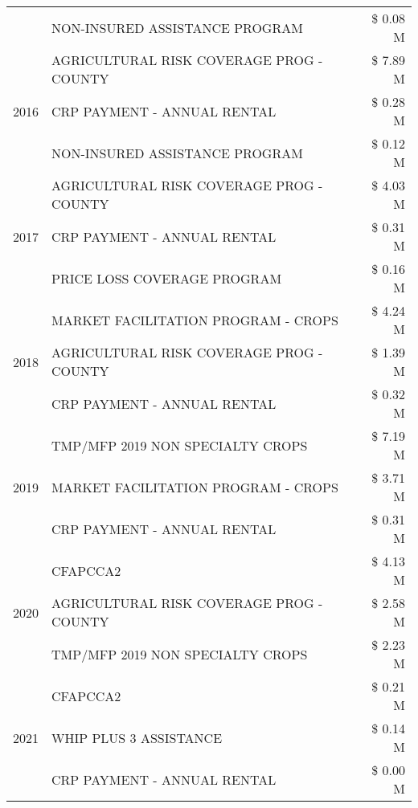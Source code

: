 \begin{tabular}{llr}
 & NON-INSURED ASSISTANCE PROGRAM & \$ 0.08 M \\
\cline{1-3}
\multirow[t]{3}{*}{2016} & AGRICULTURAL RISK COVERAGE PROG - COUNTY      & \$ 7.89 M \\
 & CRP PAYMENT - ANNUAL RENTAL                   & \$ 0.28 M \\
 & NON-INSURED ASSISTANCE PROGRAM                & \$ 0.12 M \\
\cline{1-3}
\multirow[t]{3}{*}{2017} & AGRICULTURAL RISK COVERAGE PROG - COUNTY & \$ 4.03 M \\
 & CRP PAYMENT - ANNUAL RENTAL & \$ 0.31 M \\
 & PRICE LOSS COVERAGE PROGRAM & \$ 0.16 M \\
\cline{1-3}
\multirow[t]{3}{*}{2018} & MARKET FACILITATION PROGRAM - CROPS & \$ 4.24 M \\
 & AGRICULTURAL RISK COVERAGE PROG - COUNTY & \$ 1.39 M \\
 & CRP PAYMENT - ANNUAL RENTAL & \$ 0.32 M \\
\cline{1-3}
\multirow[t]{3}{*}{2019} & TMP/MFP 2019 NON SPECIALTY CROPS & \$ 7.19 M \\
 & MARKET FACILITATION PROGRAM - CROPS & \$ 3.71 M \\
 & CRP PAYMENT - ANNUAL RENTAL & \$ 0.31 M \\
\cline{1-3}
\multirow[t]{3}{*}{2020} & CFAPCCA2 & \$ 4.13 M \\
 & AGRICULTURAL RISK COVERAGE PROG - COUNTY & \$ 2.58 M \\
 & TMP/MFP 2019 NON SPECIALTY CROPS & \$ 2.23 M \\
\cline{1-3}
\multirow[t]{3}{*}{2021} & CFAPCCA2 & \$ 0.21 M \\
 & WHIP PLUS 3 ASSISTANCE & \$ 0.14 M \\
 & CRP PAYMENT - ANNUAL RENTAL & \$ 0.00 M \\
\cline{1-3}
\bottomrule
\end{tabular}
